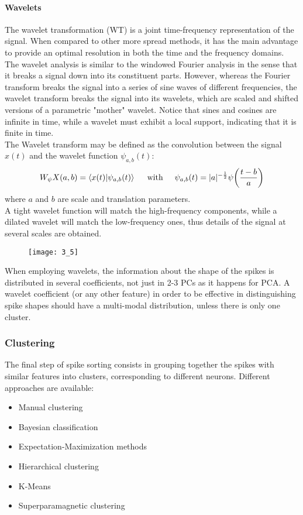 \paragraph{Wavelets}
The wavelet transformation (WT) is a joint time-frequency representation of the signal.
When compared to other more spread methods, it has the main advantage to provide an
optimal resolution in both the time and the frequency domains.\\
The wavelet analysis is similar to the windowed Fourier analysis in the sense that it breaks a
signal down into its constituent parts. However, whereas the Fourier transform breaks the
signal into a series of sine waves of different frequencies, the wavelet transform breaks
the signal into its wavelets, which are scaled and shifted versions of a parametric "mother"
wavelet. Notice that sines and cosines are infinite in time, while a wavelet must exhibit
a local support, indicating that it is finite in time.\\
The Wavelet transform may be defined as the convolution between the signal \(x(t)\) and the
wavelet function \(\psi_{a,b}(t)\):
\begin{align*}
    W_\psi X(a,b)=\left\langle x(t)|\psi_{a,b}(t) \right\rangle\hspace{0.5cm}\text{with}\hspace{0.5cm}\psi_{a,b}(t)=|a|^{-\frac{1}{2}}\psi\biggl(\frac{t-b}{a}\biggr)
\end{align*}
where \(a\) and \(b\) are scale and translation parameters.\\
A tight wavelet function will match the high-frequency components, while a dilated wavelet
will match the low-frequency ones, thus details of the signal at several scales are obtained.
\begin{figure}[H]
    \texttt{[image: 3\_5]}
    \centering
\end{figure}
When employing wavelets, the information about the shape of the spikes is distributed
in several coefficients, not just in 2-3 PCs as it happens for PCA. A wavelet
coefficient (or any other feature) in order to be effective in distinguishing spike
shapes should have a multi-modal distribution, unless there is only one cluster.
\subsubsection{Clustering}
The final step of spike sorting consists in grouping together the spikes with similar
features into clusters, corresponding to different neurons. Different approaches are
available:
\begin{itemize}
    \item Manual clustering
    \item Bayesian classification
    \item Expectation-Maximization methods
    \item Hierarchical clustering
    \item K-Means
    \item Superparamagnetic clustering
\end{itemize}
